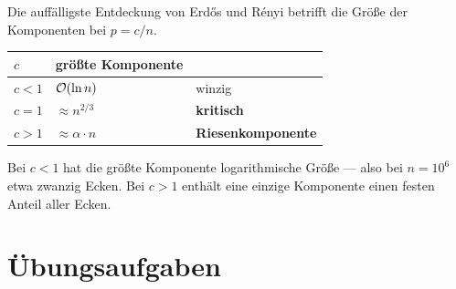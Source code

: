 \begin{merksatz}
Die auffälligste Entdeckung von Erdős und Rényi betrifft die Größe der Komponenten bei $p = c/n$.

\begin{center}
{\small
\renewcommand{\arraystretch}{1.48}
\begin{tabular}{@{}P{1.8cm}P{3.0cm}P{3.2cm}@{}}
\toprule
$c$ & \textbf{größte Komponente} & \\
\midrule
$c < 1$ & $\mathcal{O}(\ln n)$ & \textcolor{mittel}{winzig}\\
$c = 1$ & $\approx n^{2/3}$ & \textcolor{akzent}{\textbf{kritisch}}\\
$c > 1$ & $\approx \alpha \cdot n$ & \textcolor{gruen}{\textbf{Riesenkomponente}}\\
\bottomrule
\end{tabular}}
\end{center}

Bei $c < 1$ hat die größte Komponente logarithmische Größe --- also bei $n = 10^6$ etwa zwanzig Ecken. Bei $c > 1$ enthält eine einzige Komponente einen festen Anteil aller Ecken.

\begin{center}
\begin{minipage}{0.88\textwidth}
\end{minipage}
\end{center}
\end{merksatz}

\section{Übungsaufgaben}

